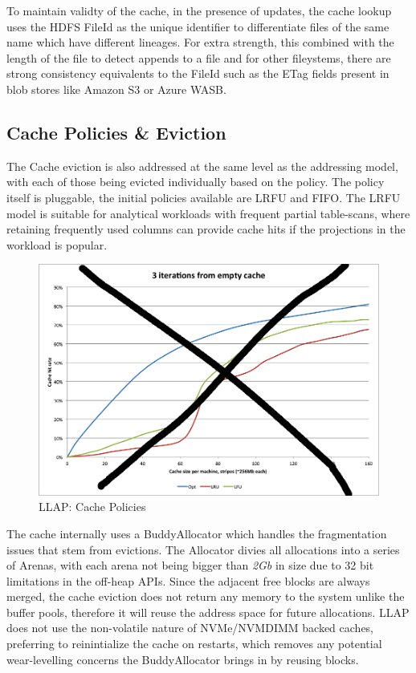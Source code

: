 To maintain validty of the cache, in the presence of updates, the cache lookup uses the HDFS FileId as the unique identifier to 
differentiate files of the same name which have different lineages. For extra strength, this combined with the length of the file
to detect appends to a file and for other fileystems, there are strong consistency equivalents to the FileId such as the ETag 
fields present in blob stores like Amazon S3\cite{S3} or Azure WASB\cite{WASB}. 

\subsection{Cache Policies \& Eviction}

The Cache eviction is also addressed at the same level as the addressing model, with each of those being evicted individually based
on the policy. The policy itself is pluggable, the initial policies available are LRFU and FIFO. The LRFU model is suitable for analytical
workloads with frequent partial table-scans, where retaining frequently used columns can provide cache hits if the projections in the
workload is popular.

\begin{figure}[H]
\centering
\includegraphics[width=0.8\columnwidth]{figures/evictions.png}
\caption{LLAP: Cache Policies}
\label{fig:eviction}
\end{figure} 

The cache internally uses a BuddyAllocator which handles the fragmentation issues that stem from evictions. The Allocator divies all
allocations into a series of Arenas, with each arena not being bigger than \emph{2Gb} in size due to 32 bit limitations in 
the off-heap APIs. Since the adjacent free blocks are always merged, the cache eviction does not return any memory to the system unlike
the buffer pools, therefore it will reuse the address space for future allocations. LLAP does not use the non-volatile nature of NVMe/NVMDIMM
backed caches, preferring to reinintialize the cache on restarts, which removes any potential wear-levelling concerns the BuddyAllocator
brings in by reusing blocks.

